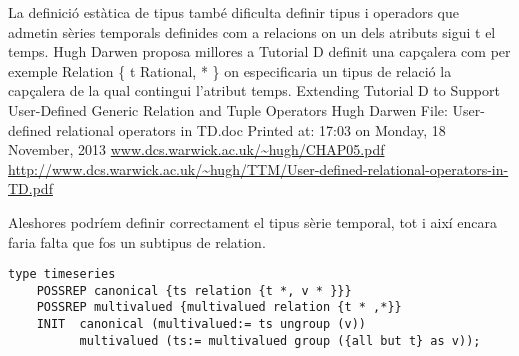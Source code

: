 La definició estàtica de tipus també dificulta definir tipus i operadors que admetin sèries temporals definides com a relacions on un dels atributs sigui t el temps. Hugh Darwen proposa millores a Tutorial D definit una capçalera com per exemple Relation \{ t Rational, * \} on especificaria un tipus de relació la capçalera de la qual contingui l'atribut temps.
Extending Tutorial D to Support User-Defined
Generic Relation and Tuple Operators
Hugh Darwen
File: User-defined relational operators in TD.doc
Printed at: 17:03 on Monday, 18 November, 2013
\url{www.dcs.warwick.ac.uk/~hugh/CHAP05.pdf}
\url{http://www.dcs.warwick.ac.uk/~hugh/TTM/User-defined-relational-operators-in-TD.pdf}


Aleshores podríem definir correctament el tipus sèrie temporal, tot i així encara faria falta que fos un subtipus de relation.

\begin{verbatim}
type timeseries
	POSSREP canonical {ts relation {t *, v * }}}
	POSSREP multivalued {multivalued relation {t * ,*}} 
	INIT  canonical (multivalued:= ts ungroup (v))
	      multivalued (ts:= multivalued group ({all but t} as v));
\end{verbatim}














